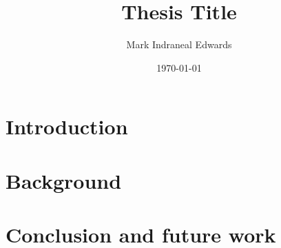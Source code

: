 \documentclass[12pt]{article}
\begin{document}
\newpage



\newpage

\title{Thesis Title}
\author{Mark Indraneal Edwards}

\date{\today}
\maketitle

\begin{abstract}
\end{abstract}

\newpage
{}

\tableofcontents

\newpage

\listoffigures

\newpage
{}

\section{Introduction}
\label{sect-intro}



\newpage
\section{Background}
\label{sect-background}



\newpage
\section{Conclusion and future work}
\label{sect-conclusion}



\newpage


\end{document}
